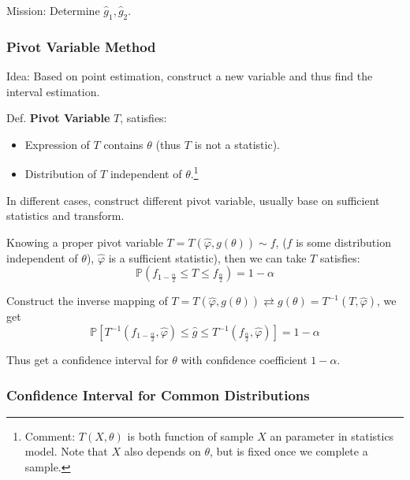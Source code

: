     Mission: Determine $\hat{g}_1,\hat{g}_2$.


\subsubsection{Pivot Variable Method}\label{SubSectionPivotVariableMethod}
    Idea: Based on point estimation, construct a new variable and thus find the interval estimation.

    Def. \textbf{Pivot Variable} $T$, satisfies: 
    \begin{itemize}[itemsep= -2 pt,parsep= -2 pt]
        \item Expression of $T$ contains $\theta$ (thus $T$ is not a statistic).
        \item Distribution of $T$ independent of $\theta$.\footnote{Comment: $ T(X,\theta ) $ is both function of sample $ X $ an parameter in statistics model. Note that $ X $ also depends on $ \theta  $, but is fixed once we complete a sample.}
    \end{itemize}

    In different cases, construct different pivot variable, usually base on sufficient statistics and transform.
    
    Knowing a proper pivot variable $T=T(\hat{\varphi},g(\theta))\sim f$, ($f$ is some distribution independent of $\theta$), $\hat{\varphi}$ is a sufficient statistic), then we can take $T$ satisfies:
    \begin{equation}
        \mathbb{P}(f_{1-\frac{\alpha}{2}}\leq T\leq f_{\frac{\alpha}{2}})=1-\alpha
    \end{equation}

    Construct the inverse mapping of $T=T(\hat{\varphi},g(\theta))\rightleftarrows g(\theta)=T^{-1}(T,\hat{\varphi})$, we get
    \begin{equation}
        \mathbb{P}[T^{-1}(f_{1-\frac{\alpha}{2}},\hat{\varphi})\leq\hat{g}\leq T^{-1}(f_{\frac{\alpha}{2}},\hat{\varphi})]=1-\alpha
    \end{equation}
    
    Thus get a confidence interval for $\theta$ with confidence coefficient $1-\alpha$.\\


\subsubsection{Confidence Interval for Common Distributions}\label{SubSectionConfidenceIntervalForDistributions}

